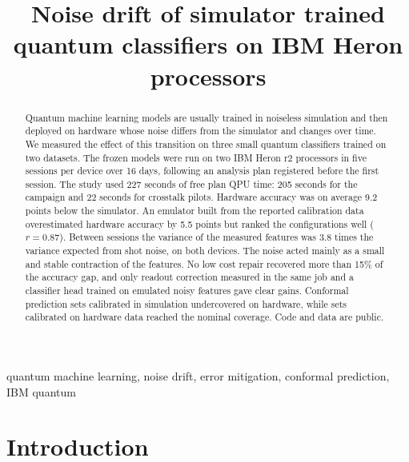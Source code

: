 \documentclass[10pt,conference]{IEEEtran}
\begin{document}
\title{Noise drift of simulator trained quantum classifiers on IBM Heron processors}

\author{
}

\maketitle

\begin{abstract}
Quantum machine learning models are usually trained in noiseless simulation and then deployed on
hardware whose noise differs from the simulator and changes over time. We measured the effect of
this transition on three small quantum classifiers trained on two datasets. The frozen models were
run on two IBM Heron r2 processors in five sessions per device over 16 days, following an analysis
plan registered before the first session. The study used 227 seconds of free plan QPU time: 205
seconds for the campaign and 22 seconds for crosstalk pilots. Hardware accuracy was on average 9.2
points below the simulator. An emulator built from the reported calibration data overestimated
hardware accuracy by 5.5 points but ranked the configurations well ($r=0.87$). Between sessions
the variance of the measured features was 3.8 times the variance expected from shot noise, on both
devices. The noise acted mainly as a small and stable contraction of the features. No low cost
repair recovered more than 15\% of the accuracy gap, and only readout correction measured in the
same job and a classifier head trained on emulated noisy features gave clear gains. Conformal
prediction sets calibrated in simulation undercovered on hardware, while sets calibrated on
hardware data reached the nominal coverage. Code and data are public.
\end{abstract}

\begin{IEEEkeywords}
quantum machine learning, noise drift, error mitigation, conformal prediction, IBM quantum
\end{IEEEkeywords}

\section{Introduction}
\end{document}
